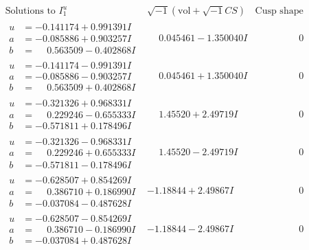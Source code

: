 \documentclass[1p]{elsarticle_modified}
\theoremstyle{definition}
\newcommand{\I}{\sqrt{-1}}
\begin{document}
$$\begin{array}{c|c|c}  
\text{Solutions to }I^u_{1}& \I (\text{vol} + \sqrt{-1}CS) & \text{Cusp shape}\\
 \hline 
\begin{aligned}
u &= -0.141174 + 0.991391 I \\
a &= -0.085886 + 0.903257 I \\
b &= \phantom{-}0.563509 - 0.402868 I\end{aligned}
 & \phantom{-}0.045461 - 1.350040 I & \phantom{-0.000000 } 0 \\ \hline\begin{aligned}
u &= -0.141174 - 0.991391 I \\
a &= -0.085886 - 0.903257 I \\
b &= \phantom{-}0.563509 + 0.402868 I\end{aligned}
 & \phantom{-}0.045461 + 1.350040 I & \phantom{-0.000000 } 0 \\ \hline\begin{aligned}
u &= -0.321326 + 0.968331 I \\
a &= \phantom{-}0.229246 - 0.655333 I \\
b &= -0.571811 + 0.178496 I\end{aligned}
 & \phantom{-}1.45520 + 2.49719 I & \phantom{-0.000000 } 0 \\ \hline\begin{aligned}
u &= -0.321326 - 0.968331 I \\
a &= \phantom{-}0.229246 + 0.655333 I \\
b &= -0.571811 - 0.178496 I\end{aligned}
 & \phantom{-}1.45520 - 2.49719 I & \phantom{-0.000000 } 0 \\ \hline\begin{aligned}
u &= -0.628507 + 0.854269 I \\
a &= \phantom{-}0.386710 + 0.186990 I \\
b &= -0.037084 - 0.487628 I\end{aligned}
 & -1.18844 + 2.49867 I & \phantom{-0.000000 } 0 \\ \hline\begin{aligned}
u &= -0.628507 - 0.854269 I \\
a &= \phantom{-}0.386710 - 0.186990 I \\
b &= -0.037084 + 0.487628 I\end{aligned}
 & -1.18844 - 2.49867 I & \phantom{-0.000000 } 0 \\ \hline\begin{aligned}

\end{aligned}
\end{array}$$
\end{document}
